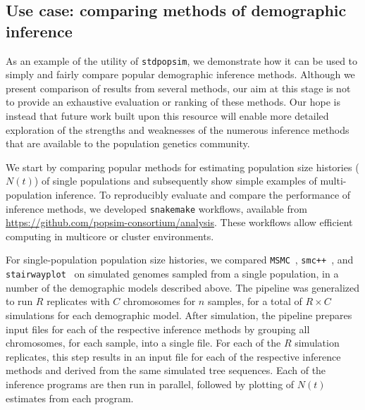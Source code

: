 \documentclass[12pt,halfline,a4paper]{ouparticle}
\newcommand{\stdpopsim}{\texttt{stdpopsim}\xspace}
\newcommand{\MSMC}{\texttt{MSMC}\xspace}
\newcommand{\smcpp}{\texttt{smc++}\xspace}
\newcommand{\stairwayplot}{\texttt{stairwayplot}\xspace}
\begin{document}
\subsection*{Use case: comparing methods of demographic inference}
As an example of the utility of \stdpopsim, we demonstrate how it can be used
to simply and fairly compare popular demographic inference methods.
Although we present comparison of results from several
methods, our aim at this stage is not to provide an exhaustive
evaluation or ranking of these methods. Our hope is instead that future work built upon this resource
will enable more detailed exploration of the strengths and weaknesses of the numerous
inference methods that are available to the population genetics community.

We start by comparing popular methods for estimating
population size histories ($N(t)$) of single populations and subsequently
show simple examples of multi-population inference.
To reproducibly evaluate and compare the performance of inference methods, we developed
\texttt{snakemake} \citep{koster2012snakemake} workflows,
available from \url{https://github.com/popsim-consortium/analysis}.
These workflows allow efficient computing in multicore or cluster environments.

For single-population population size histories, we compared
\MSMC~\citep{schiffels2014inferring}, \smcpp~\citep{terhorst2017robust}, and
\stairwayplot~\citep{liu2015exploring}
 on simulated genomes sampled from a single population,
in a number of the demographic models described above. The pipeline was generalized to
run $R$ replicates with $C$ chromosomes for $n$ samples, for a total of $R \times C$
simulations for each demographic model. After simulation, the pipeline prepares
input files for each of the respective inference methods by grouping all
chromosomes, for each sample, into a single file. For each of the $R$ simulation replicates, this step results in an
input file for each of the
respective inference methods and derived from the same simulated tree sequences.
Each of the inference programs are then run in parallel, followed by plotting of
$N(t)$ estimates from each program.
\end{document}
